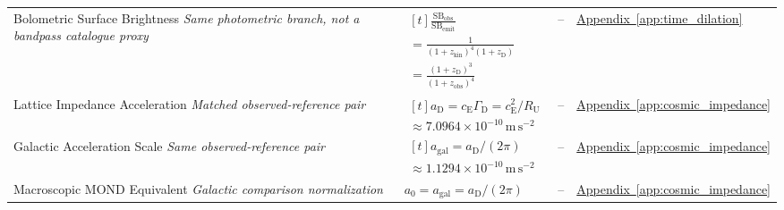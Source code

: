 \begin{longtable}{@{} p{4.5cm} p{6cm} c p{4cm} @{}}
{\raggedright Bolometric Surface Brightness \newline \textit{Same photometric branch, not a bandpass catalogue proxy}\par} & {\raggedright $\begin{gathered}[t]\frac{\mathrm{SB}_{\mathrm{obs}}}{\mathrm{SB}_{\mathrm{emit}}} \\ =\frac{1}{(1+z_{\mathrm{kin}})^4(1+z_{\mathrm D})} \\ =\frac{(1+z_{\mathrm D})^3}{(1+z_{\mathrm{obs}})^4}\end{gathered}$\par} & -- & {\raggedright \hyperref[app:time_dilation]{Appendix~\ref*{app:time_dilation}}\par} \\

{\raggedright Lattice Impedance Acceleration \newline \textit{Matched observed-reference pair}\par} & {\raggedright $\begin{gathered}[t]a_{\mathrm D}=c_{\mathrm E}\Gamma_{\mathrm D}=c_{\mathrm E}^2/R_{\mathrm U} \\ \approx7.0964\times10^{-10}\,\mathrm{m\,s^{-2}}\end{gathered}$\par} & -- & {\raggedright \hyperref[app:cosmic_impedance]{Appendix~\ref*{app:cosmic_impedance}}\par} \\

{\raggedright Galactic Acceleration Scale \newline \textit{Same observed-reference pair}\par} & {\raggedright $\begin{gathered}[t]a_{\mathrm{gal}}=a_{\mathrm D}/(2\pi) \\ \approx1.1294\times10^{-10}\,\mathrm{m\,s^{-2}}\end{gathered}$\par} & -- & {\raggedright \hyperref[app:cosmic_impedance]{Appendix~\ref*{app:cosmic_impedance}}\par} \\

{\raggedright Macroscopic MOND Equivalent \newline \textit{Galactic comparison normalization}\par} & {\raggedright $a_0=a_{\mathrm{gal}}=a_{\mathrm D}/(2\pi)$\par} & -- & {\raggedright \hyperref[app:cosmic_impedance]{Appendix~\ref*{app:cosmic_impedance}}\par} \\


\end{longtable}
